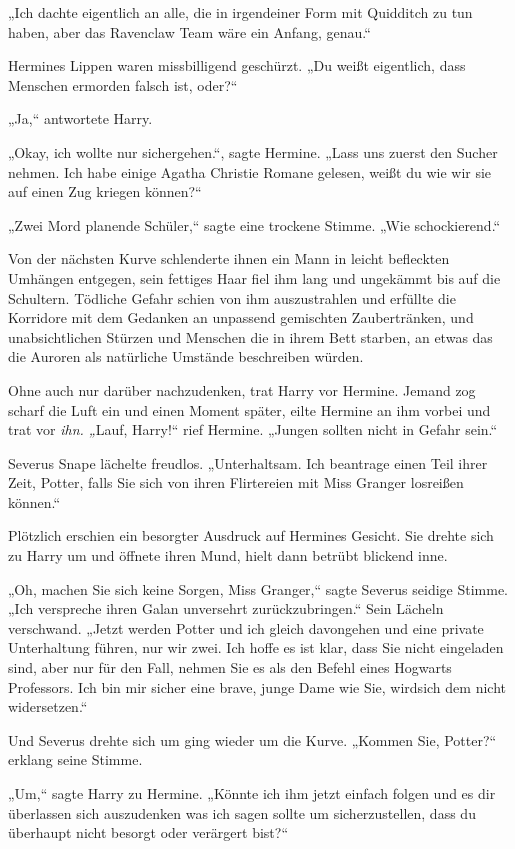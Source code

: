 {„Ich dachte eigentlich an alle, die in irgendeiner Form mit Quidditch zu tun haben, aber das Ravenclaw Team wäre ein Anfang, genau.“

Hermines Lippen waren missbilligend geschürzt. „Du weißt eigentlich, dass Menschen ermorden falsch ist, oder?“

„Ja,“ antwortete Harry.

„Okay, ich wollte nur sichergehen.“, sagte Hermine. „Lass uns zuerst den Sucher nehmen. Ich habe einige Agatha Christie Romane gelesen, weißt du wie wir sie auf einen Zug kriegen können?“

„Zwei Mord planende Schüler,“ sagte eine trockene Stimme. „Wie schockierend.“

Von der nächsten Kurve schlenderte ihnen ein Mann in leicht befleckten Umhängen entgegen, sein fettiges Haar fiel ihm lang und ungekämmt bis auf die Schultern. Tödliche Gefahr schien von ihm auszustrahlen und erfüllte die Korridore mit dem Gedanken an unpassend gemischten Zaubertränken, und unabsichtlichen Stürzen und Menschen die in ihrem Bett starben, an etwas das die Auroren als natürliche Umstände beschreiben würden.

Ohne auch nur darüber nachzudenken, trat Harry vor Hermine. Jemand zog scharf die Luft ein und einen Moment später, eilte Hermine an ihm vorbei und trat vor \emph{ihn. „}Lauf, Harry!“ rief Hermine. „Jungen sollten nicht in Gefahr sein.“

Severus Snape lächelte freudlos. „Unterhaltsam. Ich beantrage einen Teil ihrer Zeit, Potter, falls Sie sich von ihren Flirtereien mit Miss Granger losreißen können.“

Plötzlich erschien ein besorgter Ausdruck auf Hermines Gesicht. Sie drehte sich zu Harry um und öffnete ihren Mund, hielt dann betrübt blickend inne.

„Oh, machen Sie sich keine Sorgen, Miss Granger,“ sagte Severus seidige Stimme. „Ich verspreche ihren Galan unversehrt zurückzubringen.“ Sein Lächeln verschwand. „Jetzt werden Potter und ich gleich davongehen und eine private Unterhaltung führen, nur wir zwei. Ich hoffe es ist klar, dass Sie nicht eingeladen sind, aber nur für den Fall, nehmen Sie es als den Befehl eines Hogwarts Professors. Ich bin mir sicher eine brave, junge Dame wie Sie, wirdsich dem nicht widersetzen.“

Und Severus drehte sich um ging wieder um die Kurve. „Kommen Sie, Potter?“ erklang seine Stimme.

„Um,“ sagte Harry zu Hermine. „Könnte ich ihm jetzt einfach folgen und es dir überlassen sich auszudenken was ich sagen sollte um sicherzustellen, dass du überhaupt nicht besorgt oder verärgert bist?“

}
